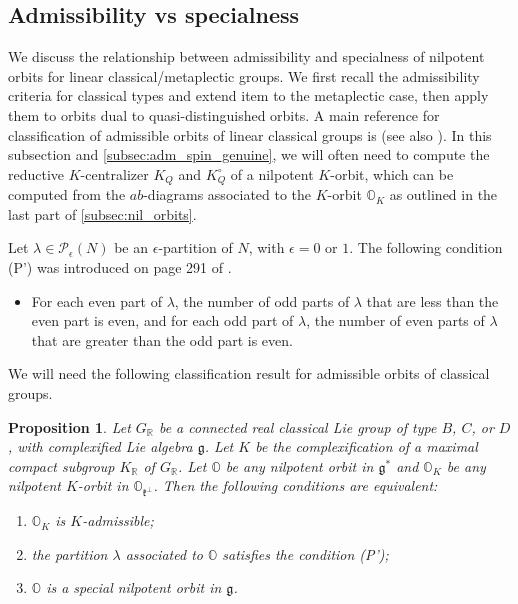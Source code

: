 \documentclass[11pt, a4paper]{amsart}
\newcommand{\g}{\mathfrak{g}}
\newcommand{\orb}{\mathbb{O}}
\newcommand{\orbk}{\orb_{K}}
\newcommand{\fg}{\mathfrak{g}}
\newcommand{\fk}{\mathfrak{k}}
\newcommand{\cP}{\mathcal{P}}
\newcommand{\R}{\mathbb{R}}
\newtheorem{Prop}[Thm]{Proposition}
\theoremstyle{definition}
\numberwithin{equation}{section}
\begin{document}
\subsection{Admissibility vs specialness}\label{subsec:adm_special_orbit}

We discuss the relationship between admissibility and specialness of nilpotent orbits for linear classical/metaplectic groups. We first recall the admissibility criteria for classical types and extend item to the metaplectic case, then apply them to orbits dual to quasi-distinguished orbits. A main reference for classification of admissible orbits of linear classical groups is \cite{Ohta:Adm} (see also \cite{Schwartz}). In this subsection and \cref{subsec:adm_spin_genuine}, we will often need to compute the reductive $K$-centralizer $K_Q$ and $K_Q^\circ$ of a nilpotent $K$-orbit, which can be computed from the $ab$-diagrams associated to the $K$-orbit $\orbk$ as outlined in the last part of \cref{subsec:nil_orbits}.

Let $\lambda \in \cP_\epsilon(N)$ be an $\epsilon$-partition of $N$, with $\epsilon = 0$ or $1$. The following condition (P') was introduced on page 291 of \cite{Ohta:Adm}.

\begin{itemize}
    \item[(P')] For each even part of $\lambda$, the number of odd parts of $\lambda$ that are less than the even part is even, and for each odd part of $\lambda$, the number of even parts of $\lambda$ that are greater than the odd part is even.
\end{itemize}

We will need the following classification result for admissible orbits of classical groups.

\begin{Prop}\label{prop:adm_classical}
	Let $G_\R$ be a connected real classical Lie group of type $B$, $C$, or $D$, with complexified Lie algebra $\fg$. Let $K$ be the complexification of a maximal compact subgroup $K_\R$ of $G_\R$. Let $\orb$ be any nilpotent orbit in $\g^*$ and $\orbk$ be any nilpotent $K$-orbit in $\orb_{\fk^\perp}$. Then the following conditions are equivalent:
	\begin{enumerate}[label=(\roman*)]
		\item $\orbk$ is $K$-admissible;
		\item the partition $\lambda$ associated to $\orb$ satisfies the condition (P');
		\item $\orb$ is a special nilpotent orbit in $\fg$.
	\end{enumerate}
\end{Prop}
\end{document}
